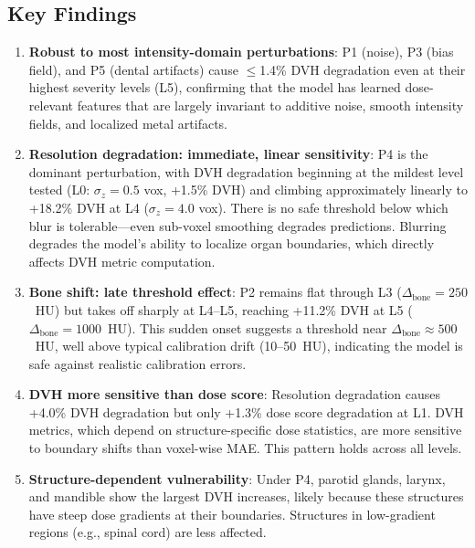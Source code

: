 \documentclass[11pt,a4paper]{article}
\begin{document}
\subsection{Key Findings}

\begin{enumerate}
    \item \textbf{Robust to most intensity-domain perturbations}: P1 (noise), P3 (bias field), and P5 (dental artifacts) cause $\leq$1.4\% DVH degradation even at their highest severity levels (L5), confirming that the model has learned dose-relevant features that are largely invariant to additive noise, smooth intensity fields, and localized metal artifacts.

    \item \textbf{Resolution degradation: immediate, linear sensitivity}: P4 is the dominant perturbation, with DVH degradation beginning at the mildest level tested (L0: $\sigma_z = 0.5$ vox, +1.5\% DVH) and climbing approximately linearly to +18.2\% DVH at L4 ($\sigma_z = 4.0$ vox). There is no safe threshold below which blur is tolerable---even sub-voxel smoothing degrades predictions. Blurring degrades the model's ability to localize organ boundaries, which directly affects DVH metric computation.

    \item \textbf{Bone shift: late threshold effect}: P2 remains flat through L3 ($\Delta_\text{bone} = 250$~HU) but takes off sharply at L4--L5, reaching +11.2\% DVH at L5 ($\Delta_\text{bone} = 1000$~HU). This sudden onset suggests a threshold near $\Delta_\text{bone} \approx 500$~HU, well above typical calibration drift (10--50~HU), indicating the model is safe against realistic calibration errors.

    \item \textbf{DVH more sensitive than dose score}: Resolution degradation causes +4.0\% DVH degradation but only +1.3\% dose score degradation at L1. DVH metrics, which depend on structure-specific dose statistics, are more sensitive to boundary shifts than voxel-wise MAE. This pattern holds across all levels.

    \item \textbf{Structure-dependent vulnerability}: Under P4, parotid glands, larynx, and mandible show the largest DVH increases, likely because these structures have steep dose gradients at their boundaries. Structures in low-gradient regions (e.g., spinal cord) are less affected.
\end{enumerate}
\end{document}
